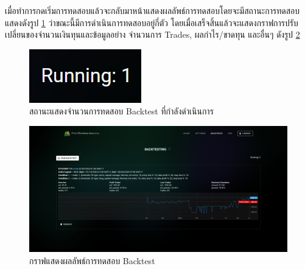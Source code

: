 \FloatBarrier
เมื่อทำการกดเริ่มการทดสอบแล้วจะกลับมาหน้าแสดงผลลัพธ์การทดสอบโดยจะมีสถานะการทดสอบแสดงดังรูป \ref{fig:backtest-running} ว่าขณะนี้มีการดำเนินการทดสอบอยู่กี่ตัว โดยเมื่อเสร็จสิ้นแล้วจะแสดงกราฟการปรับเปลี่ยนของจำนวนเงินทุนและข้อมูลอย่าง จำนวนการ Trades, ผลกำไร/ขาดทุน และอื่นๆ ดังรูป \ref{fig:backtest-with-result}
\begin{figure}[ht]
    \centering
    \includegraphics[scale=0.75]{images/web-tuts/backtest-running.PNG}
    \caption{สถานะแสดงจำนวนการทดสอบ Backtest ที่กำลังดำเนินการ}
    \label{fig:backtest-running}
\end{figure}
\begin{figure}[ht]
    \centering
    \includegraphics[width=\textwidth]{images/web-tuts/backtest-with-result.PNG}
    \caption{กราฟแสดงผลลัพธ์การทดสอบ Backtest}
    \label{fig:backtest-with-result}
\end{figure}
\FloatBarrier

